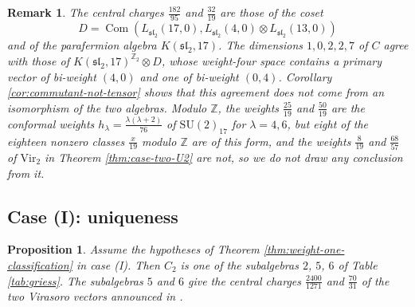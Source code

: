\documentclass[leqno]{article}
\newcommand{\Z}{\ensuremath{\mathbb{Z}}}
\newcommand{\ot}{\otimes}
\newtheorem{prop}[thm]{Proposition}
\newtheorem{remark}[thm]{Remark}
\numberwithin{equation}{section}
\begin{document}
\begin{remark}\normalfont
\label{rem:commutant-cosets}
The central charges $\frac{182}{95}$ and $\frac{32}{19}$ are those of the coset
\[
D = \operatorname{Com}(L_{\mathfrak{sl}_2}(17,0), L_{\mathfrak{sl}_2}(4,0) \ot L_{\mathfrak{sl}_2}(13,0))
\]
and of the parafermion algebra $K(\mathfrak{sl}_2,17)$. The dimensions $1, 0, 2, 2, 7$ of $C$ agree with those of $K(\mathfrak{sl}_2,17)^{\Z_2} \ot D$, whose weight-four space contains a primary vector of bi-weight $(4,0)$ and one of bi-weight $(0,4)$. Corollary \ref{cor:commutant-not-tensor} shows that this agreement does not come from an isomorphism of the two algebras. Modulo $\Z$, the weights $\frac{25}{19}$ and $\frac{50}{19}$ are the conformal weights $h_\lambda = \frac{\lambda(\lambda+2)}{76}$ of $\mathrm{SU}(2)_{17}$ for $\lambda = 4, 6$, but eight of the eighteen nonzero classes $\frac{x}{19}$ modulo $\Z$ are of this form, and the weights $\frac{8}{19}$ and $\frac{68}{57}$ of $\mathrm{Vir}_2$ in Theorem \ref{thm:case-two-U2} are not, so we do not draw any conclusion from it.
\end{remark}


\subsection{Case (I): uniqueness}
\label{subsec:case-one}

\begin{prop}
\label{prop:case-one-control}
Assume the hypotheses of Theorem \ref{thm:weight-one-classification} in case (I). Then $C_2$ is one of the subalgebras $2$, $5$, $6$ of Table \ref{tab:griess}. The subalgebras $5$ and $6$ give the central charges $\frac{2400}{1271}$ and $\frac{70}{31}$ of the two Virasoro vectors announced in \cite[Section 1]{Rie26b}.
\end{prop}
\end{document}
